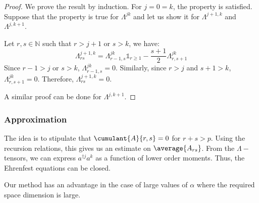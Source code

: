 \begin{proof}
    We prove the result by induction. For $j = 0 = k$, the property is satisfied. Suppose that the property is true for $\Lambda^{j k}$ and let us show it for $\Lambda^{j+1, k}$ and $\Lambda^{j, k+1}$.

    Let $r, s \in \mathbb{N}$ such that $r>j+1$ or $s>k$, we have:
    \begin{equation}
        \Lambda^{j+1, k}_{r s} = \Lambda^{j k}_{r-1, s} \mathbb{1}_{r \ge 1} - \frac{s+1}{2} \Lambda^{j k}_{r, s+1}
    \end{equation}
    Since $r-1 > j$ or $s>k$, $\Lambda^{j k}_{r-1, s} = 0$. Similarly, since $r>j$ and $s+1>k$, $\Lambda^{j k}_{r, s+1} = 0$. Therefore, $\Lambda^{j+1, k}_{r s} = 0$.

    A similar proof can be done for $\Lambda^{j, k+1}$.
\end{proof}

\subsubsection{Approximation}

The idea is to stipulate that $\cumulant{A}{r,s} = 0$ for $r + s > p$. Using the recursion relations, this gives us an estimate on $\average{A_{r s}}$. From the $\Lambda-$tensors, we can express $a^{\dagger j} a^k$ as a function of lower order moments. Thus, the Ehrenfest equations can be closed.

Our method has an advantage in the case of large values of $\alpha$ where the required space dimension is large.